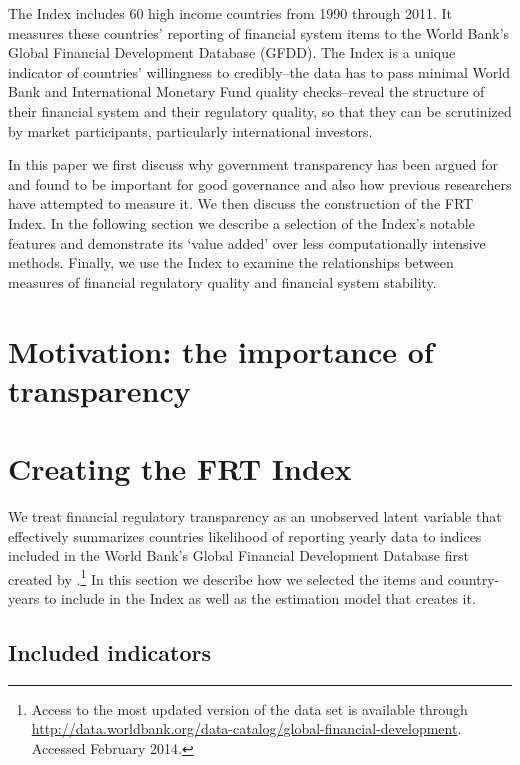 \documentclass[a4paper]{article}
\begin{document}
The Index includes 60 high income countries from 1990 through 2011. It measures these countries' reporting of financial system items to the World Bank's Global Financial Development Database (GFDD). The Index is a unique indicator of countries' willingness to credibly--the data has to pass minimal World Bank and International Monetary Fund quality checks--reveal the structure of their financial system and their regulatory quality, so that they can be scrutinized by market participants, particularly international investors.

In this paper we first discuss why government transparency has been argued for and found to be important for good governance and also how previous researchers have attempted to measure it. We then discuss the construction of the FRT Index. In the following section we describe a selection of the Index's notable features and demonstrate its `value added' over less computationally intensive methods. Finally, we use the Index to examine the relationships between measures of financial regulatory quality and financial system stability.

\section{Motivation: the importance of transparency}


\section{Creating the FRT Index}

We treat financial regulatory transparency as an unobserved latent variable that effectively summarizes countries likelihood of reporting yearly data to indices included in the World Bank's Global Financial Development Database first created by \cite{Cihak2012}.\footnote{Access to the most updated version of the data set is available through \url{http://data.worldbank.org/data-catalog/global-financial-development}. Accessed February 2014.} In this section we describe how we selected the items and country-years to include in the Index as well as the estimation model that creates it.

\subsection{Included indicators}
\end{document}
